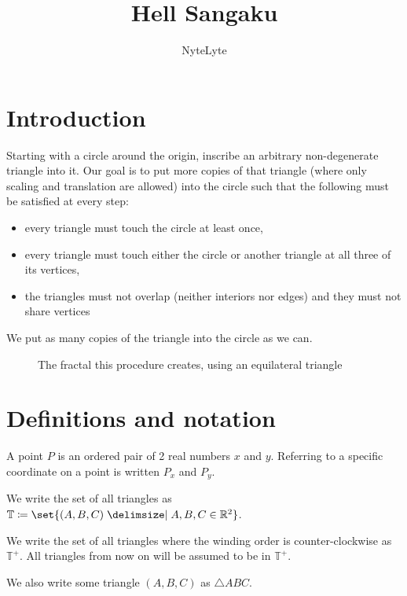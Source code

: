 \documentclass[a4paper,12pt]{article}
\title{Hell Sangaku}
\author{NyteLyte}
\date{}
\theoremstyle{definition}
\theoremstyle{plain}
\begin{document}
	\maketitle

	\tableofcontents
	\pagebreak

	\section{Introduction}

	Starting with a circle around the origin, inscribe an arbitrary non-degenerate triangle into it.
	Our goal is to put more copies of that triangle (where only scaling and translation are
	allowed) into the circle such that the following must be satisfied at every step:\begin{itemize}
		\item every triangle must touch the circle at least once,
		\item every triangle must touch either the circle or another triangle at all three of its vertices,
		\item the triangles must not overlap (neither interiors nor edges) and they must not share vertices
	\end{itemize}

	We put as many copies of the triangle into the circle as we can.

	\begin{figure}[h]
		\centering
		\def\svgwidth{\columnwidth}
		\scalebox{0.85}{}
		\caption{The fractal this procedure creates, using an equilateral triangle}
	\end{figure}

	\newpage
	\section{Definitions and notation}

	A point $P$ is an ordered pair of 2 real numbers $x$ and $y$.
	Referring to a specific coordinate on a point is written $P_x$ and $P_y$.
	
	We write the set of all triangles as $\mathbb{T} \coloneqq \set{ (A, B, C) \given A, B, C \in \mathbb{R}^2 }$.

	We write the set of all triangles where the winding order is counter-clockwise as $\mathbb{T}^+$. All triangles from now on will be assumed to be in $\mathbb{T}^+$.

	We also write some triangle $\left(A, B, C\right)$ as $\triangle ABC$.
	
\end{document}
